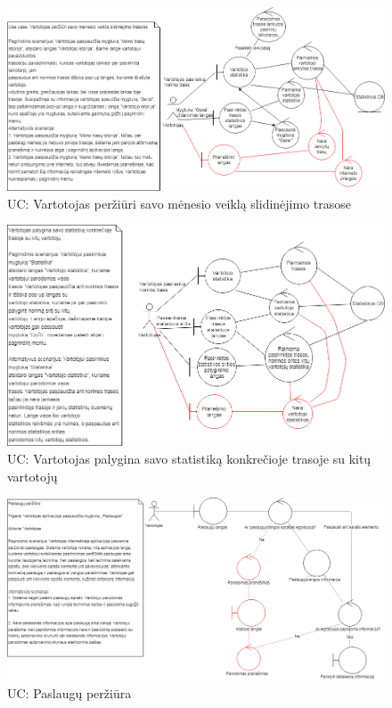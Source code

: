 \documentclass[oneside]{VUMIFPSkursinis}
\begin{document}
\begin{figure}[h]
    \centering
    \includegraphics[width=1.0\textwidth]{rob2.png}
    \caption{UC: Vartotojas peržiūri savo mėnesio veiklą slidinėjimo trasose}
    \label{fig:rob2}
\end{figure}

\begin{figure}[h]
    \centering
    \includegraphics[width=1.0\textwidth]{rob3.png}
    \caption{UC: Vartotojas palygina savo statistiką konkrečioje trasoje su kitų vartotojų}
    \label{fig:rob3}
\end{figure}
\vskip 1cm

\begin{figure}[h]
    \centering
    \includegraphics[width=1.0\textwidth]{Rob4.png}
    \caption{UC: Paslaugų peržiūra}
    \label{fig:rob4}
\end{figure}
\vskip 1cm
\end{document}

